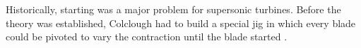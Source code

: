





Historically, starting was a major problem for supersonic turbines. Before the theory was established, Colclough had to build a special jig in which every blade could be pivoted to vary the contraction until the blade started \cite{colcloughDesignTurbineBlades1966}.

